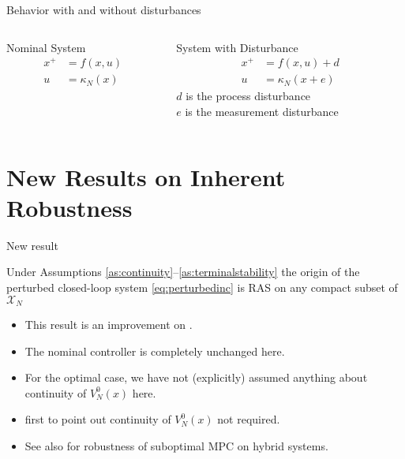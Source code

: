 \documentclass{beamer}
\begin{document}
\begin{frame}{Behavior with and without disturbances}

\begin{columns}[t]
\begin{column}{0.45\textwidth}
\centerline{\resizebox{0.7\textwidth}{!}{}}
\begin{block}{Nominal System}
\begin{align*}
x^+ &= f(x, u)\\
u   &= \kappa_N(x)
\end{align*}
\end{block}
\end{column}

\begin{column}{0.45\textwidth}
\centerline{\resizebox{0.7\textwidth}{!}{}}
\begin{block}{System with Disturbance}
\begin{align*}
x^+ &= f(x, u) + d\\
u   &= \kappa_N(x + e)
\end{align*}
$d$ is the process disturbance\\
$e$ is the measurement disturbance
\end{block}
\end{column}
\end{columns}
\end{frame}


\section{New Results on Inherent Robustness}

\begin{frame}{New result}
\begin{theorem}
\label{th:mainiss}
Under Assumptions \ref{as:continuity}--\ref{as:terminalstability}
the origin of the perturbed closed-loop system 
\eqref{eq:perturbedinc} is RAS on any compact subset
of $\mathcal{X}_N$
\end{theorem}
\begin{itemize}
\item This result is an improvement on
  \cite{pannocchia:rawlings:wright:2011}. 
\item The nominal controller is completely unchanged here.
\item For the optimal case, we have not (explicitly) assumed anything
  about continuity of $V_N^0(x)$ here.
\item \cite{yu:reble:chen:allgower:2011} first to point out continuity
  of $V_N^0(x)$ not required.
\item See also \cite{lazar:heemels:2009} for 
  robustness of suboptimal MPC on hybrid systems.
\end{itemize}


\end{frame}
\end{document}
